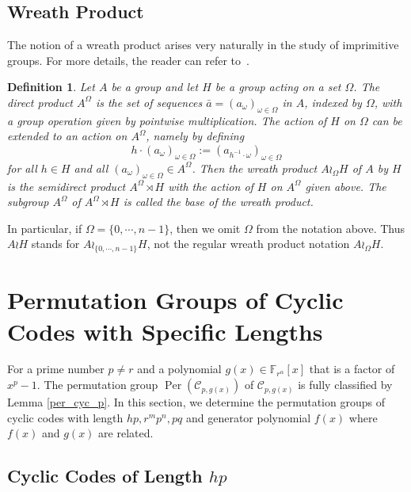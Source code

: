 \documentclass[journal,12pt,onecolumn]{IEEEtran}
\newtheorem{definition}{Definition}
\begin{document}
\subsection{Wreath Product}

The notion of a wreath product arises very naturally in the study of imprimitive groups. For more details, the reader can refer to~\cite{dixon_permutation_1996}. 

  
\begin{definition}
    Let \( A \) be a group and let \( H \) be a group acting on a set \( \Omega \). The direct product \( A^\Omega \) is the set of sequences \( \bar{a} = (a_\omega)_{\omega \in \Omega} \) in \( A \), indexed by \( \Omega \), with a group operation given by pointwise multiplication. The action of \( H \) on \( \Omega \) can be extended to an action on \( A^\Omega \), namely by defining  
    \[
        h \cdot (a_\omega)_{\omega \in \Omega} := (a_{h^{-1}\cdot\omega})_{\omega \in \Omega}
    \]
    for all \( h \in H \) and all \( (a_\omega)_{\omega \in \Omega} \in A^\Omega \). Then the wreath product \( A  \wr_\Omega  H \) of \( A \) by \( H \) is the semidirect product \( A^\Omega \rtimes H \) with the action of \( H \) on \( A^\Omega \) given above. The subgroup \( A^\Omega \) of \( A^\Omega \rtimes H \) is called the base of the wreath product.
\end{definition}
  


In particular, if \(\Omega = \{0, \cdots, n-1\}\), then we omit \( \Omega \) from the notation above. Thus \( A \wr H \) stands for \( A \wr_{\{0, \cdots, n-1\}} H \), not the regular wreath product notation \( A \wr_\Omega H \).



\section{Permutation Groups of Cyclic Codes with Specific Lengths}\label{Per}

For a prime number $p\neq r$ and a polynomial $g(x)\in\mathbb{F}_{r^\alpha}[x]$ that is a factor of $x^p-1$. The permutation group $\operatorname{Per}(\mathcal{C}_{p,g(x)})$ of $\mathcal{C}_{p,g(x)}$ is fully classified by Lemma \ref{per_cyc_p}. In this section, we determine the permutation groups of cyclic codes with length $hp,r^mp^n,pq$ and generator polynomial $f(x)$ where $f(x)$ and $g(x)$ are related.



\subsection{Cyclic Codes of Length $hp$}
\end{document}
